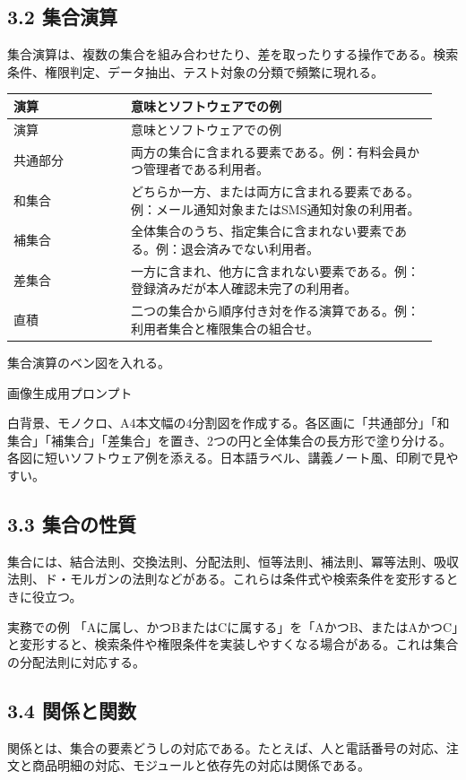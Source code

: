 \documentclass[uplatex,dvipdfmx,a4paper,10pt]{jsarticle}
\begin{document}
\subsection{3.2 集合演算}
集合演算は、複数の集合を組み合わせたり、差を取ったりする操作である。検索条件、権限判定、データ抽出、テスト対象の分類で頻繁に現れる。

\begin{longtable}{>{\raggedright\arraybackslash}p{0.26\linewidth} >{\raggedright\arraybackslash}p{0.68\linewidth}}
\toprule
演算 & 意味とソフトウェアでの例 \\
\midrule
\endfirsthead
\toprule
演算 & 意味とソフトウェアでの例 \\
\midrule
\endhead
共通部分 & 両方の集合に含まれる要素である。例：有料会員かつ管理者である利用者。 \\
和集合 & どちらか一方、または両方に含まれる要素である。例：メール通知対象またはSMS通知対象の利用者。 \\
補集合 & 全体集合のうち、指定集合に含まれない要素である。例：退会済みでない利用者。 \\
差集合 & 一方に含まれ、他方に含まれない要素である。例：登録済みだが本人確認未完了の利用者。 \\
直積 & 二つの集合から順序付き対を作る演算である。例：利用者集合と権限集合の組合せ。 \\
\bottomrule
\end{longtable}
\begin{todobox}
集合演算のベン図を入れる。

画像生成用プロンプト

白背景、モノクロ、A4本文幅の4分割図を作成する。各区画に「共通部分」「和集合」「補集合」「差集合」を置き、2つの円と全体集合の長方形で塗り分ける。各図に短いソフトウェア例を添える。日本語ラベル、講義ノート風、印刷で見やすい。
\end{todobox}
\subsection{3.3 集合の性質}
集合には、結合法則、交換法則、分配法則、恒等法則、補法則、冪等法則、吸収法則、ド・モルガンの法則などがある。これらは条件式や検索条件を変形するときに役立つ。

\begin{infobox}{実務での例}
「Aに属し、かつBまたはCに属する」を「AかつB、またはAかつC」と変形すると、検索条件や権限条件を実装しやすくなる場合がある。これは集合の分配法則に対応する。
\end{infobox}
\subsection{3.4 関係と関数}
関係とは、集合の要素どうしの対応である。たとえば、人と電話番号の対応、注文と商品明細の対応、モジュールと依存先の対応は関係である。
\end{document}
